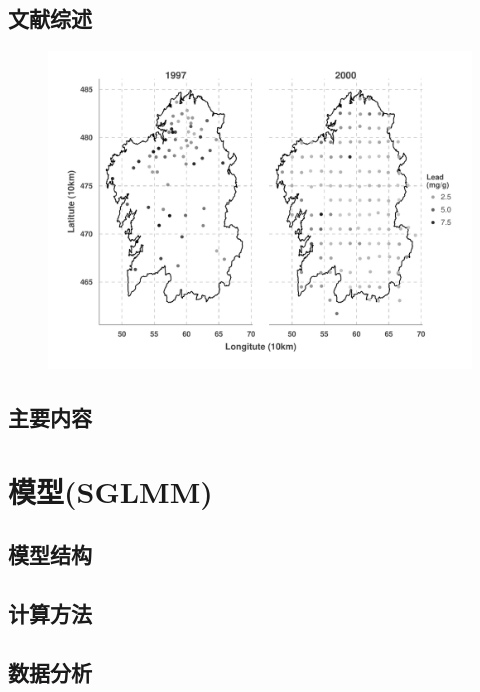 \documentclass[11pt,compress,xcolor=x11names,UTF8]{beamer}
\begin{document}
\subsection{文献综述}

\begin{frame}
\begin{figure}
\centering
\includegraphics[width=.8\textwidth]{demo04}  
\end{figure}
\end{frame}

\subsection{主要内容}


\section{模型(SGLMM)}

\subsection{模型结构}

\subsection{计算方法}

\subsection{数据分析}
\end{document}

